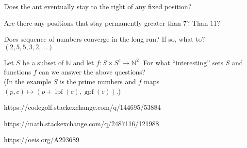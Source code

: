 \documentclass{article}
\begin{document}
\begin{question}
  Does the ant eventually stay to the right of any fixed position?
\end{question}
\begin{related}
  \item Are there any positions that stay permanently greater than $7$? Than $11$?
  \item Does sequence of numbers converge in the long run? If so, what to?
    $(2, 5, 5, 3, 2, \hdots)$
  \item Let $S$ be a subset of $\mathbb{N}$ and let
    $f: S\times S^{c} \rightarrow \mathbb{N}^2$.
    For what ``interesting'' sets $S$ and functions $f$ can we answer the above
    questions?\\
    (In the example $S$ is the prime numbers and $f$ maps
    $(p, c) \mapsto (p + \operatorname{lpf}(c), \operatorname{gpf}(c))$.)
\end{related}
\begin{references}
  \item https://codegolf.stackexchange.com/q/144695/53884
  \item https://math.stackexchange.com/q/2487116/121988
  \item https://oeis.org/A293689
\end{references}
\end{document}
